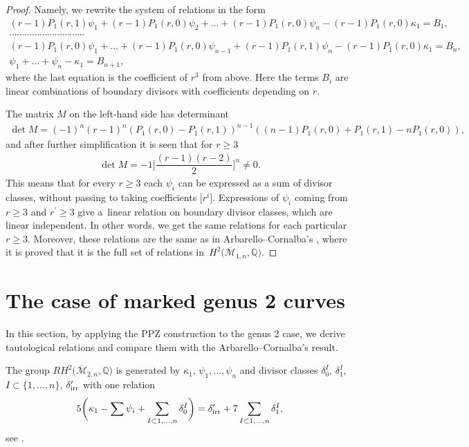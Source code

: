 \documentclass[10pt,a4paper]{amsart}
\def\oM{\overline{\mathcal{M}}}
\numberwithin{equation}{section}
\begin{document}
\begin{proof}
Namely, we rewrite the system of relations in the form
\begin{gather*}
(r-1)P_1(r,1)\psi_1+(r-1)P_1(r,0)\psi_2+\dots+(r-1)P_1(r,0)\psi_n -(r-1)P_1(r,0)\kappa_1 =B_1,
\\
\cdots\cdots\cdots\cdots\cdots\cdots\cdots\cdots\cdots\cdots
\\
(r-1)P_1(r,0)\psi_1 + \dots + (r-1)P_1(r,0)\psi_{n-1}\!+(r-1)P_1(r,1)\psi_n\!-(r-1)P_1(r,0)\kappa_1 =B_n,
\\
\psi_1 +\dots+ \psi_n - \kappa_1 = B_{n+1},
\end{gather*}
where the last equation is the coefficient of $r^3$ from above.
Here the terms $B_i$ are linear combinations of boundary divisors with coefficients depending on $r$.

The matrix $M$ on the left-hand side has determinant
\begin{align*}
\det M = (-1)^n(r-1)^{n}(P_1(r,0) - P_1(r,1))^{n-1}((n-1)P_1(r,0) + P_1(r,1)- nP_1(r,0)),
\end{align*}
and after further simplification it is seen that for $ r \geq 3$
\begin{align*}
\det M= -1\Bigg[\dfrac{(r-1)(r-2)}{2}\Bigg]^n \neq 0.
\end{align*}
This means that for every $r\geq3$ each $\psi_i$ can be expressed as a sum of divisor classes, without passing to taking coefficients $\big[r^i\big]$. Expressions of $\psi_i$ coming from $r\geq3$ and $r^{\prime}\geq3$ give a~linear relation on boundary divisor classes, which are linear independent. In other words,
we get the same relations for each particular $r\geq3$. Moreover, these relations are the same as in Arbarello--Cornalba's \cite[Theorem 2.2]{Cor}, where it is proved that it is the full set of relations in~$H^2\big(\oM_{1,n},\mathbb{Q}\big)$.
\end{proof}

\section{The case of marked genus 2 curves}
In this section, by applying the PPZ construction to the genus 2 case, we derive tautological relations and compare them with the Arbarello--Cornalba's result.

The group $RH^2\big(\oM_{2,n},\mathbb{Q}\big)$ is generated by $\kappa_1$, $\psi_1,\dots,\psi_n$ and divisor classes $\delta_0^I$, $\delta_1^I$, $I\subset\{1,\dots,n\}$, $\delta^{\prime}_{\rm irr}$ with one relation
\begin{align*}
	5\bigg(\kappa_1 - \sum \psi_i + \sum_{I\subset{1,\dots,n}}\delta_0^{I}\bigg) = \delta_{\rm irr}^{\prime} + 7\sum_{I\subset{1,\dots,n}}\delta_1^{I},
\end{align*}
see \cite[Theorem 2.2]{Cor}.
\end{document}
